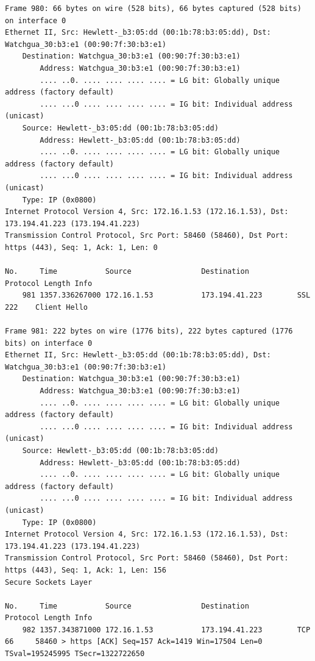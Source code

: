 \documentclass[a4paper,11pt]{article}
\begin{document}
\begin{lstlisting}
Frame 980: 66 bytes on wire (528 bits), 66 bytes captured (528 bits) on interface 0
Ethernet II, Src: Hewlett-_b3:05:dd (00:1b:78:b3:05:dd), Dst: Watchgua_30:b3:e1 (00:90:7f:30:b3:e1)
    Destination: Watchgua_30:b3:e1 (00:90:7f:30:b3:e1)
        Address: Watchgua_30:b3:e1 (00:90:7f:30:b3:e1)
        .... ..0. .... .... .... .... = LG bit: Globally unique address (factory default)
        .... ...0 .... .... .... .... = IG bit: Individual address (unicast)
    Source: Hewlett-_b3:05:dd (00:1b:78:b3:05:dd)
        Address: Hewlett-_b3:05:dd (00:1b:78:b3:05:dd)
        .... ..0. .... .... .... .... = LG bit: Globally unique address (factory default)
        .... ...0 .... .... .... .... = IG bit: Individual address (unicast)
    Type: IP (0x0800)
Internet Protocol Version 4, Src: 172.16.1.53 (172.16.1.53), Dst: 173.194.41.223 (173.194.41.223)
Transmission Control Protocol, Src Port: 58460 (58460), Dst Port: https (443), Seq: 1, Ack: 1, Len: 0

No.     Time           Source                Destination           Protocol Length Info
    981 1357.336267000 172.16.1.53           173.194.41.223        SSL      222    Client Hello

Frame 981: 222 bytes on wire (1776 bits), 222 bytes captured (1776 bits) on interface 0
Ethernet II, Src: Hewlett-_b3:05:dd (00:1b:78:b3:05:dd), Dst: Watchgua_30:b3:e1 (00:90:7f:30:b3:e1)
    Destination: Watchgua_30:b3:e1 (00:90:7f:30:b3:e1)
        Address: Watchgua_30:b3:e1 (00:90:7f:30:b3:e1)
        .... ..0. .... .... .... .... = LG bit: Globally unique address (factory default)
        .... ...0 .... .... .... .... = IG bit: Individual address (unicast)
    Source: Hewlett-_b3:05:dd (00:1b:78:b3:05:dd)
        Address: Hewlett-_b3:05:dd (00:1b:78:b3:05:dd)
        .... ..0. .... .... .... .... = LG bit: Globally unique address (factory default)
        .... ...0 .... .... .... .... = IG bit: Individual address (unicast)
    Type: IP (0x0800)
Internet Protocol Version 4, Src: 172.16.1.53 (172.16.1.53), Dst: 173.194.41.223 (173.194.41.223)
Transmission Control Protocol, Src Port: 58460 (58460), Dst Port: https (443), Seq: 1, Ack: 1, Len: 156
Secure Sockets Layer

No.     Time           Source                Destination           Protocol Length Info
    982 1357.343871000 172.16.1.53           173.194.41.223        TCP      66     58460 > https [ACK] Seq=157 Ack=1419 Win=17504 Len=0 TSval=195245995 TSecr=1322722650


\end{lstlisting}
\end{document}
